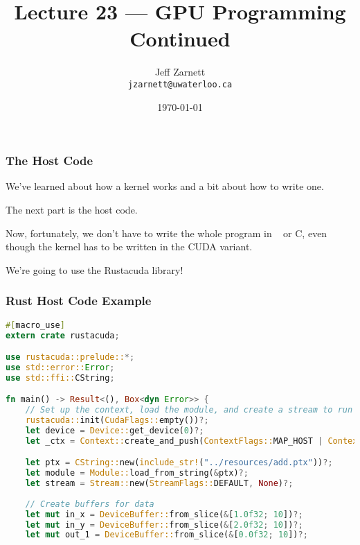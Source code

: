 

\title{Lecture 23 --- GPU Programming Continued }

\author{Jeff Zarnett \\ \small \texttt{jzarnett@uwaterloo.ca}}
\date{\today}




\begin{frame}
  \titlepage

\end{frame}


\begin{frame}
\frametitle{The Host Code}

We've learned about how a kernel works and a bit about how to write one. 

The next part is the host code.

Now, fortunately, we don't have to write the whole program in \CPP~ or C, even though the kernel has to be written in the CUDA variant. 

We're going to use the Rustacuda library!
\end{frame}


\begin{frame}[fragile]
\frametitle{Rust Host Code Example}
\begin{lstlisting}[language=Rust]
#[macro_use]
extern crate rustacuda;

use rustacuda::prelude::*;
use std::error::Error;
use std::ffi::CString;

fn main() -> Result<(), Box<dyn Error>> {
    // Set up the context, load the module, and create a stream to run kernels in.
    rustacuda::init(CudaFlags::empty())?;
    let device = Device::get_device(0)?;
    let _ctx = Context::create_and_push(ContextFlags::MAP_HOST | ContextFlags::SCHED_AUTO, device)?;

    let ptx = CString::new(include_str!("../resources/add.ptx"))?;
    let module = Module::load_from_string(&ptx)?;
    let stream = Stream::new(StreamFlags::DEFAULT, None)?;
    
    // Create buffers for data
    let mut in_x = DeviceBuffer::from_slice(&[1.0f32; 10])?;
    let mut in_y = DeviceBuffer::from_slice(&[2.0f32; 10])?;
    let mut out_1 = DeviceBuffer::from_slice(&[0.0f32; 10])?;
\end{lstlisting}

\end{frame}


